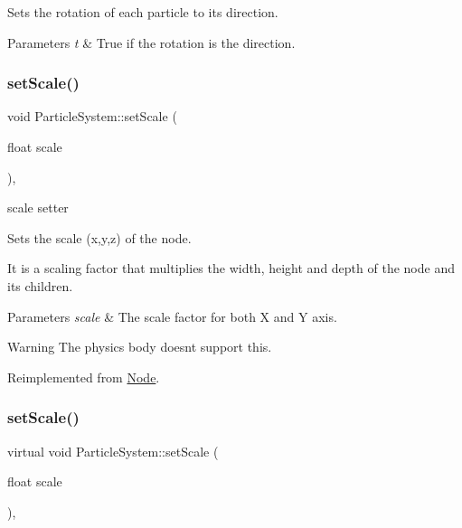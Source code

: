 Sets the rotation of each particle to its direction.


\begin{DoxyParams}{Parameters}
{\em t} & True if the rotation is the direction. \\
\hline
\end{DoxyParams}
\mbox{\label{classParticleSystem_ad53bd7f8621c6ea670a5c63866d7b682}} 
\subsubsection{\texorpdfstring{set\+Scale()}{setScale()}\hspace{0.1cm}{\footnotesize\ttfamily [1/2]}}
{\footnotesize\ttfamily void Particle\+System\+::set\+Scale (\begin{DoxyParamCaption}\item[{float}]{scale }\end{DoxyParamCaption})\hspace{0.3cm}{\ttfamily [override]}, {\ttfamily [virtual]}}



scale setter 

Sets the scale (x,y,z) of the node.

It is a scaling factor that multiplies the width, height and depth of the node and its children.


\begin{DoxyParams}{Parameters}
{\em scale} & The scale factor for both X and Y axis.\\
\hline
\end{DoxyParams}
\begin{DoxyWarning}{Warning}
The physics body doesn\textquotesingle{}t support this. 
\end{DoxyWarning}


Reimplemented from \hyperlink{classNode_acf0955a52f51a9d6c8b0c9267b1e8668}{Node}.

\mbox{\label{classParticleSystem_a9bf57aacb9df62eb5e836c2504904678}} 
\subsubsection{\texorpdfstring{set\+Scale()}{setScale()}\hspace{0.1cm}{\footnotesize\ttfamily [2/2]}}
{\footnotesize\ttfamily virtual void Particle\+System\+::set\+Scale (\begin{DoxyParamCaption}\item[{float}]{scale }\end{DoxyParamCaption})\hspace{0.3cm}{\ttfamily [override]}, {\ttfamily [virtual]}}



